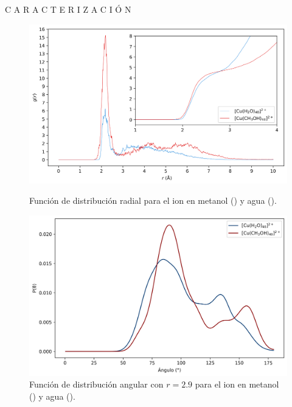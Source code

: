 \documentclass[final]{beamer}
\newlength{\colwidth}
\begin{document}
\begin{frame}[t]
\begin{columns}[t]
\begin{column}{\colwidth}
\begin{block}{C A R A C T E R I Z A C I Ó N }{}
				\begin{figure}[H]
					\centering
					\begin{minipage}[c]{0.49\textwidth} %
						\centering
						\includegraphics[width=\textwidth]{logos/RDF-OUTPUT-HISTOGRAMA.png}
						\caption{Función de distribución radial para el ion  en metanol () y agua ().}
						\label{fig:rdfcu40ch4o}
					\end{minipage}%
					\hfill %
					\begin{minipage}[c]{0.49\textwidth} %
						\centering
						\includegraphics[width=\textwidth]{logos/ADF-OUTPUT-HISTOGRAMA.png}
						\caption{Función de distribución angular con $r = 2.9$ para el ion  en metanol () y agua ().}
						\label{fig:adfcu40ch4o}
					\end{minipage}
				\end{figure}


\end{block}
\end{column}
\end{columns}
\end{frame}
\end{document}
